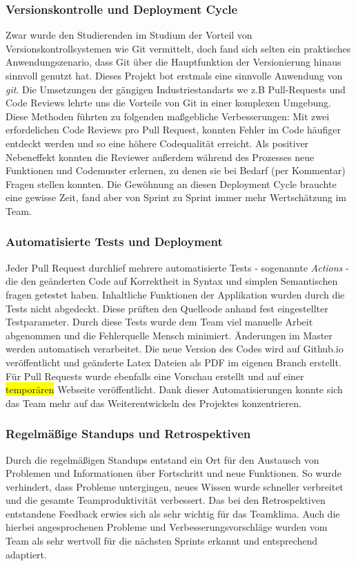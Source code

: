 \documentclass[10pt, a4paper]{article}
\begin{document}
\subsubsection{Versionskontrolle und Deployment Cycle}
Zwar wurde den Studierenden im Studium der Vorteil von Versionskontrollsystemen wie Git vermittelt, doch fand sich selten ein praktisches Anwendungszenario, dass Git über die Hauptfunktion der Versionierung hinaus sinnvoll genutzt hat.
Dieses Projekt bot erstmals eine sinnvolle Anwendung von \textit{git}.
Die Umsetzungen der gängigen Industriestandarts we z.B Pull-Requests und Code Reviews lehrte uns die Vorteile von Git in einer komplexen Umgebung.
Diese Methoden führten zu folgenden maßgebliche Verbesserungen:
Mit zwei erfordelichen Code Reviews pro Pull Request, konnten Fehler im Code häufiger entdeckt werden und so eine höhere Codequalität erreicht.
Als positiver Nebeneffekt konnten die Reviewer außerdem während des Prozesses neue Funktionen und Codemuster erlernen, zu denen sie bei Bedarf (per Kommentar) Fragen stellen konnten.
Die Gewöhnung an diesen Deployment Cycle brauchte eine gewisse Zeit, fand aber von Sprint zu Sprint immer mehr Wertschätzung im Team.

\subsubsection{Automatisierte Tests und Deployment}
Jeder Pull Request durchlief mehrere automatisierte Tests - sogenannte \textit{Actions} - die den geänderten Code auf Korrektheit in Syntax und simplen Semantischen fragen getestet haben.
Inhaltliche Funktionen der Applikation wurden durch die Tests nicht abgedeckt.
Diese prüften den Quellcode anhand fest eingestellter Testparameter.
Durch diese Tests wurde dem Team viel manuelle Arbeit abgenommen und die Fehlerquelle Mensch minimiert.
Änderungen im Master werden automatisch verarbeitet. Die neue Version des Codes wird auf Github.io veröffentlicht und geänderte Latex Dateien als PDF im eigenen Branch erstellt.
Für Pull Requests wurde ebenfalls eine Vorschau erstellt und auf einer \colorbox{yellow}{temporären} Webseite veröffentlicht.
Dank dieser Automatisierungen konnte sich das Team mehr auf das Weiterentwickeln des Projektes konzentrieren.

\subsubsection{Regelmäßige Standups und Retrospektiven}
Durch die regelmäßigen Standups entstand ein Ort für den Austausch von Problemen und Informationen über Fortschritt und neue Funktionen.
So wurde verhindert, dass Probleme untergingen, neues Wissen wurde schneller verbreitet und die gesamte Teamproduktivität verbessert.
Das bei den Retrospektiven entstandene Feedback erwies sich als sehr wichtig für das Teamklima.
Auch die hierbei angesprochenen Probleme und Verbesserungsvorschläge wurden vom Team als sehr wertvoll für die nächsten Sprints erkannt und entsprechend adaptiert.
\end{document}
